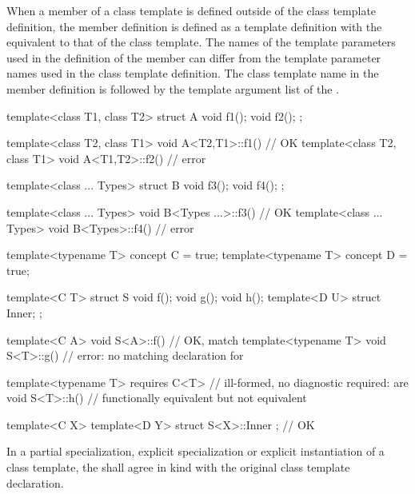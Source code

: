 \pnum
\begin{note}
When a member of a class
template is defined outside of the class template definition,
the member definition is defined as a template definition with the
 equivalent to that
of the class template.
The names of the template parameters used in the definition of the member
can differ from the template parameter names used in the class
template definition.
The class template name in the member definition is followed by
the template argument list of the .
\begin{example}
\begin{codeblock}
template<class T1, class T2> struct A {
  void f1();
  void f2();
};

template<class T2, class T1> void A<T2,T1>::f1() { }    // OK
template<class T2, class T1> void A<T1,T2>::f2() { }    // error
\end{codeblock}

\begin{codeblock}
template<class ... Types> struct B {
  void f3();
  void f4();
};

template<class ... Types> void B<Types ...>::f3() { }   // OK
template<class ... Types> void B<Types>::f4() { }       // error
\end{codeblock}

\begin{codeblock}
template<typename T> concept C = true;
template<typename T> concept D = true;

template<C T> struct S {
  void f();
  void g();
  void h();
  template<D U> struct Inner;
};

template<C A> void S<A>::f() { }        // OK,  match
template<typename T> void S<T>::g() { } // error: no matching declaration for 

template<typename T> requires C<T>      // ill-formed, no diagnostic required:  are
void S<T>::h() { }                      // functionally equivalent but not equivalent

template<C X> template<D Y>
struct S<X>::Inner { };                 // OK
\end{codeblock}
\end{example}
\end{note}

\pnum
In a partial specialization,
explicit specialization or
explicit instantiation of a class template,
the 
shall agree in kind with the original class template declaration.

